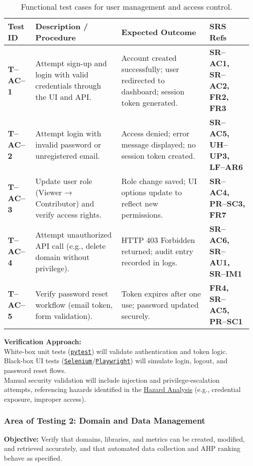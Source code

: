 \documentclass[12pt, titlepage]{article}
\begin{document}
\begin{table}[H]
\centering
\begin{tabularx}{\textwidth}{|l|X|X|X|}
\hline
\textbf{Test ID} & \textbf{Description / Procedure} & \textbf{Expected Outcome} & \textbf{SRS Refs} \\
\hline
\textbf{T--AC--1} &
Attempt sign-up and login with valid credentials through the UI and API. &
Account created successfully; user redirected to dashboard; session token generated. &
\textbf{SR--AC1, SR--AC2, FR2, FR3} \\
\hline
\textbf{T--AC--2} &
Attempt login with invalid password or unregistered email. &
Access denied; error message displayed; no session token created. &
\textbf{SR--AC5, UH--UP3, LF--AR6} \\
\hline
\textbf{T--AC--3} &
Update user role (Viewer → Contributor) and verify access rights. &
Role change saved; UI options update to reflect new permissions. &
\textbf{SR--AC4, PR--SC3, FR7} \\
\hline
\textbf{T--AC--4} &
Attempt unauthorized API call (e.g., delete domain without privilege). &
HTTP 403 Forbidden returned; audit entry recorded in logs. &
\textbf{SR--AC6, SR--AU1, SR--IM1} \\
\hline
\textbf{T--AC--5} &
Verify password reset workflow (email token, form validation). &
Token expires after one use; password updated securely. &
\textbf{FR4, SR--AC5, PR--SC1} \\
\hline
\end{tabularx}
\caption{Functional test cases for user management and access control.}
\end{table}

\noindent\textbf{Verification Approach:}\\
White-box unit tests (\texttt{\href{https://requests-mock.readthedocs.io/en/latest/overview.html}{pytest}}) will validate authentication and token logic.\\
Black-box UI tests (\texttt{\href{https://www.selenium.dev/}{Selenium}}/\texttt{\href{https://playwright.dev/}{Playwright}}) will simulate login, logout, and password reset flows.\\
Manual security validation will include injection and privilege-escalation attempts, referencing hazards identified in the \href{https://github.com/thaafei/DomainX/blob/main/docs/HazardAnalysis/HazardAnalysis.pdf}{Hazard Analysis} (e.g., credential exposure, improper access).\\[0.5em]


\subsubsection{Area of Testing 2: Domain and Data Management}
\textbf{Objective:} Verify that domains, libraries, and metrics can be created, modified, and retrieved accurately, and that automated data collection and AHP ranking behave as specified.
\end{document}
